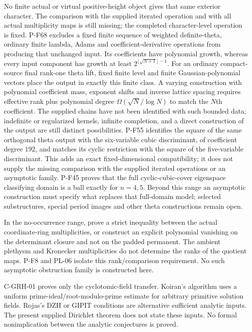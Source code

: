\begin{description}
No finite actual or virtual positive-height object gives that
same exterior character. The comparison with the supplied
iterated operation and with all actual multiplicity maps is
still missing; the completed character-level operation is fixed.
P-F68 excludes a fixed finite sequence of weighted definite-theta,
ordinary finite lambda, Adams and coefficient-derivative operations
from producing that unchanged input.  Its coefficients have
polynomial growth, whereas every input component has growth at
least $2^{\lfloor\sqrt{N+1}\rfloor-1}$.
For an ordinary compact-source final rank-one theta lift, fixed
finite level and finite Gaussian-polynomial vectors place the
output in exactly this finite class.  A varying construction
with polynomial coefficient mass, exponent shifts and inverse
lattice spacing requires effective rank plus polynomial degree
$\Omega(\sqrt N/\log N)$ to match the $N$th coefficient.
The supplied chains have not been identified with such bounded
data; indefinite or regularized kernels, infinite completion,
and a direct construction of the output are still distinct
possibilities.
P-F55 identifies the square of the same orthogonal theta output
with the six-variable cubic discriminant, of coefficient degree
$192$, and matches its cyclic restriction with the square of
the five-variable discriminant. This adds an exact fixed-dimensional
compatibility; it does not supply the missing comparison with
the supplied iterated operations or an asymptotic family.
P-F45 proves that the full cyclic-cubic-cover eigenspace
classifying domain is a ball exactly for $n=4,5$. Beyond
this range an asymptotic construction must specify what
replaces that full-domain model; selected substructures,
special period images and other theta constructions remain open.

\item[O-OBSTRUCTION: an actual family of separating equations.]
In the no-occurrence range, prove a strict inequality between the actual
coordinate-ring multiplicities, or construct an explicit polynomial
vanishing on the determinant closure and not on the padded permanent.
The ambient plethysm and Kronecker multiplicities do not determine the
ranks of the quotient maps. P-F8 and PL-06 isolate this rank/comparison
requirement. No such asymptotic obstruction family is constructed here.

\item[O-DIR-HN: arbitrary solution fields in Nullstellensatz.]
C-GRH-01 proves only the cyclotomic-field transfer. Koiran's algorithm uses
a uniform prime-ideal/root-modulo-prime estimate for arbitrary primitive
solution fields. Rojas's DZH or GIPIT conditions are alternative sufficient
analytic inputs. The present supplied Dirichlet theorem does not state
these inputs. No formal nonimplication between the analytic conjectures
is proved.


\end{description}
